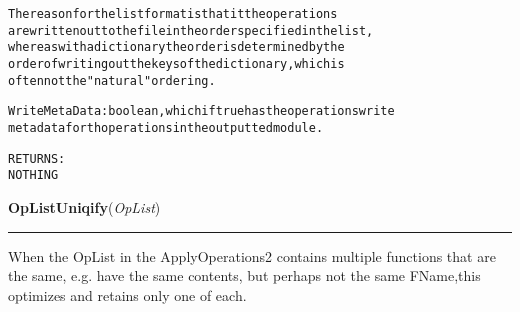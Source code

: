 \begin{boxedminipage}{\funcwidth}
\begin{alltt}
        The reason for the list format is that it the operations 
        are written out to the file in the order specified in the list,
        whereas with a dictionary the order is  determined by the 
        order of writing out the keys of the dictionary, which is
        often not the "natural" ordering. 

WriteMetaData: boolean, which if true has the operations write 
metadata for th operations in the outputted module.
        
RETURNS:
        NOTHING
\end{alltt}

\setlength{\parskip}{1ex}
    \end{boxedminipage}

    \label{System:Protocols:OpListUniqify}

    \vspace{0.5ex}

\hspace{.8\funcindent}\begin{boxedminipage}{\funcwidth}

    \raggedright \textbf{OpListUniqify}(\textit{OpList})

    \vspace{-1.5ex}

    \rule{\textwidth}{0.5\fboxrule}
\setlength{\parskip}{2ex}
    When the OpList in the ApplyOperations2 contains multiple functions 
    that are the same, e.g. have the same contents, but perhaps not the 
    same FName,this optimizes and retains only one of each.

\setlength{\parskip}{1ex}
    \end{boxedminipage}

